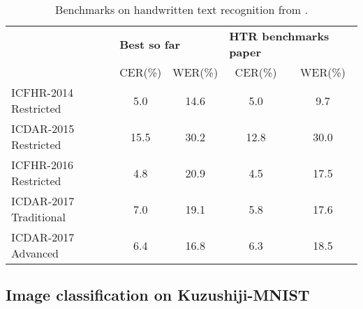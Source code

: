 \begin{table*}
	\begin{tabular}{lcccc}
		\rowcolor[HTML]{EFEFEF}
		\cellcolor[HTML]{EFEFEF}                                     & \multicolumn{2}{l}{\cellcolor[HTML]{EFEFEF}\textbf{Best so far}} & \multicolumn{2}{l}{\cellcolor[HTML]{EFEFEF}\textbf{HTR benchmarks paper}} \\
		\rowcolor[HTML]{EFEFEF}
		\multirow{-2}{*}{\cellcolor[HTML]{EFEFEF}\textbf{Benchmark}} & CER(\%)                         & WER(\%)                        & CER(\%)                             & WER(\%)                             \\
		ICFHR-2014 Restricted                                        & 5.0                             & 14.6                           & 5.0                                 & 9.7                                 \\
		ICDAR-2015 Restricted                                        & 15.5                            & 30.2                           & 12.8                                & 30.0                                \\
		ICFHR-2016 Restricted                                        & 4.8                             & 20.9                           & 4.5                                 & 17.5                                \\
		ICDAR-2017 Traditional                                       & 7.0                             & 19.1                           & 5.8                                 & 17.6                                \\
		ICDAR-2017 Advanced                                          & 6.4                             & 16.8                           & 6.3                                 & 18.5
	\end{tabular}
	\caption{Benchmarks on handwritten text recognition from \cite{Sanchez2019-pi}.}
	\label{tab:htr-benchmarks}
\end{table*}

\subsection{Image classification on Kuzushiji-MNIST}
\label{ssec:imagemnist}

